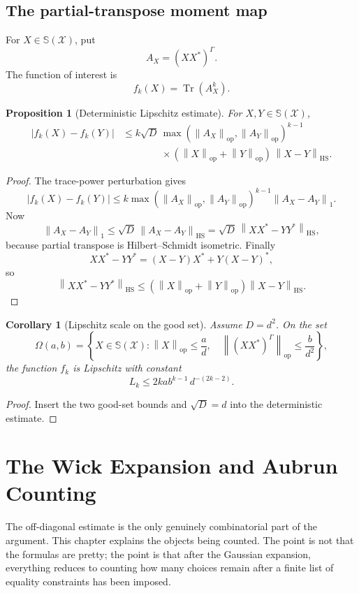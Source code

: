 \documentclass[11pt,oneside]{book}
\newtheorem{proposition}[theorem]{Proposition}
\newtheorem{corollary}[theorem]{Corollary}
\DeclareMathOperator{\Tr}{Tr}
\newcommand{\1}{\mathbf 1}
\newcommand{\GammaPT}{\Gamma}
\newcommand{\HS}{\mathrm{HS}}
\newcommand{\op}{\mathrm{op}}
\newcommand{\sphere}{\mathbb S}
\newcommand{\norm}[1]{\left\|#1\right\|}
\begin{document}
\section{The partial-transpose moment map}

For \(X\in\sphere(\mathcal X)\), put
\[
  A_X=(XX^*)^{\GammaPT}.
\]
The function of interest is
\[
  f_k(X)=\Tr(A_X^k).
\]

\begin{proposition}[Deterministic Lipschitz estimate]
For \(X,Y\in\sphere(\mathcal X)\),
\[
\begin{aligned}
|f_k(X)-f_k(Y)|
&\le
k\sqrt D\,
\max(\norm{A_X}_{\op},\norm{A_Y}_{\op})^{k-1}\\
&\qquad\qquad
\times
(\norm X_{\op}+\norm Y_{\op})\,\norm{X-Y}_{\HS}.
\end{aligned}
\]
\end{proposition}

\begin{proof}
The trace-power perturbation gives
\[
  |f_k(X)-f_k(Y)|
  \le
  k\max(\norm{A_X}_{\op},\norm{A_Y}_{\op})^{k-1}
  \norm{A_X-A_Y}_1.
\]
Now
\[
  \norm{A_X-A_Y}_1
  \le
  \sqrt D\,\norm{A_X-A_Y}_{\HS}
  =
  \sqrt D\,\norm{XX^*-YY^*}_{\HS},
\]
because partial transpose is Hilbert--Schmidt isometric.  Finally
\[
  XX^*-YY^*
  =
  (X-Y)X^*+Y(X-Y)^*,
\]
so
\[
  \norm{XX^*-YY^*}_{\HS}
  \le
  (\norm X_{\op}+\norm Y_{\op})\norm{X-Y}_{\HS}.
\]
\end{proof}

\begin{corollary}[Lipschitz scale on the good set]
Assume \(D=d^2\).  On the set
\[
  \Omega(a,b)
  =
  \left\{
    X\in\sphere(\mathcal X):
    \norm X_{\op}\le\frac ad,\quad
    \norm{(XX^*)^{\GammaPT}}_{\op}\le\frac b{d^2}
  \right\},
\]
the function \(f_k\) is Lipschitz with constant
\[
  L_k\le 2kab^{k-1}\,d^{-(2k-2)}.
\]
\end{corollary}

\begin{proof}
Insert the two good-set bounds and \(\sqrt D=d\) into the deterministic
estimate.
\end{proof}

\chapter{The Wick Expansion and Aubrun Counting}

The off-diagonal estimate is the only genuinely combinatorial part of the
argument.  This chapter explains the objects being counted.  The point is not
that the formulas are pretty; the point is that after the Gaussian expansion,
everything reduces to counting how many choices remain after a finite list of
equality constraints has been imposed.
\end{document}
